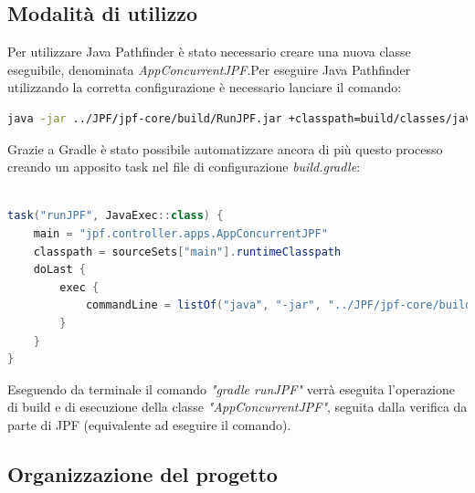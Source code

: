 \subsection{Modalità di utilizzo}
Per utilizzare Java Pathfinder è stato necessario creare una nuova classe eseguibile, denominata \textit{AppConcurrentJPF}.\newline Per eseguire Java Pathfinder utilizzando la corretta configurazione è necessario lanciare il comando:
\begin{lstlisting}[language=bash, caption="Comando utilizzato per eseguire Java Pathfinder"]
java -jar ../JPF/jpf-core/build/RunJPF.jar +classpath=build/classes/java/main jpf.controller.apps.AppConcurrentJPF
\end{lstlisting}
Grazie a Gradle è stato possibile automatizzare ancora di più questo processo creando un apposito task nel file di configurazione \textit{build.gradle}:
\begin{lstlisting}[language=Java, caption="Gradle Task utilizzato per eseguire Java Pathfinder"]

task("runJPF", JavaExec::class) {
    main = "jpf.controller.apps.AppConcurrentJPF"
    classpath = sourceSets["main"].runtimeClasspath
    doLast {
        exec {
            commandLine = listOf("java", "-jar", "../JPF/jpf-core/build/RunJPF.jar", "+classpath=build/classes/java/main", "jpf.controller.apps.AppConcurrentJPF")
        }
    }
}
\end{lstlisting}
Eseguendo da terminale il comando \textit{"gradle runJPF"} verrà eseguita l'operazione di build e di esecuzione della classe \textit{"AppConcurrentJPF"}, seguita dalla verifica da parte di JPF (equivalente ad eseguire il comando).

\subsection{Organizzazione del progetto}

